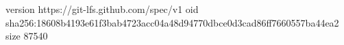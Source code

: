 version https://git-lfs.github.com/spec/v1
oid sha256:18608b4193e61f3bab4723acc04a48d94770dbce0d3cad86ff7660557ba44ea2
size 87540
